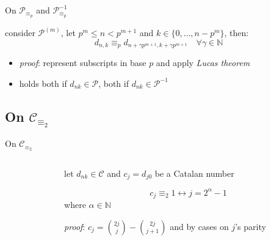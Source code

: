 \documentclass[10pt,serif, professionalfont]{beamer}
\begin{document}
\begin{frame}{On $\mathcal{P}_{\equiv_{p}}$ and $\mathcal{P}_{\equiv_{p}}^{-1}$}
    \begin{theorem}
        consider $\mathcal{P}^{(m)}$, let $p^{m} \leq n < p^{m+1}$ and 
        $k\in\lbrace0,\ldots,n-p^{m}\rbrace$, then:
        \begin{displaymath}
            d_{n,k} \equiv_{p} d_{n+\gamma p^{m+1}, k+\gamma p^{m+1}}
                \quad\forall\gamma\in\mathbb{N}
        \end{displaymath}
    \end{theorem}
    \begin{itemize}
        \item \emph{proof}: represent subscripts in base $p$ and apply \emph{Lucas theorem}
        \item holds both if $d_{nk}\in\mathcal{P}$, both if $d_{nk}\in\mathcal{P}^{-1}$
    \end{itemize}

    
\end{frame}

\subsection{On $\mathcal{C}_{\equiv_{2}}$}

\begin{frame}{On $\mathcal{C}_{\equiv_{2}}$}
    \begin{columns}[T] %
        \begin{column}[T]{5cm} %
            
        \end{column}
        \begin{column}[T]{5cm} %
            let $d_{nk}\in\mathcal{C}$ and $c_{j}=d_{j0}$ be a Catalan number
            \begin{theorem}
                \begin{displaymath}
                    c_{j} \equiv_{2}1 \leftrightarrow j=2^{\alpha}-1
                \end{displaymath}
                where $\alpha\in\mathbb{N}$
            \end{theorem}
            \emph{proof}: $c_{j} = {{2j}\choose{j}} - {{2j}\choose{j+1}}$ and by cases on $j$'s parity
        \end{column}
    \end{columns}
\end{frame}
\end{document}
